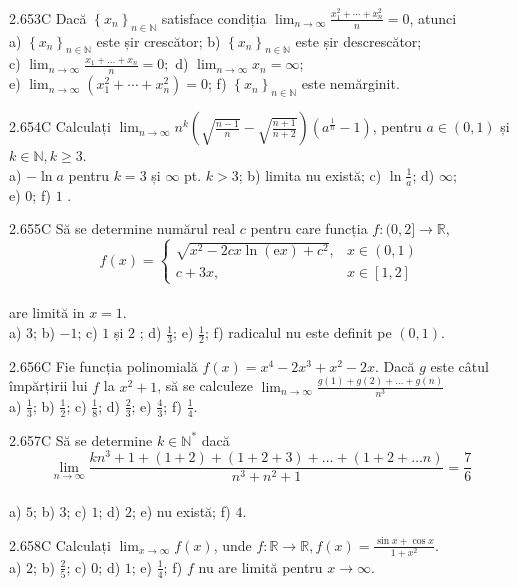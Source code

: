\documentclass[11pt]{article}
\begin{document}
2.653C Dacă $\left\{x_{n}\right\}_{n \in \mathbb{N}}$ satisface condiția $\lim _{n \rightarrow \infty} \frac{x_{1}^{2}+\cdots+x_{n}^{2}}{n}=0$, atunci\\ a) $\left\{x_{n}\right\}_{n \in \mathbb{N}}$ este șir crescător; b) $\left\{x_{n}\right\}_{n \in \mathbb{N}}$ este șir descrescător;\\ c) $\lim _{n \rightarrow \infty} \frac{x_{1}+\ldots+x_{n}}{n}=0 ;$ d) $\lim _{n \rightarrow \infty} x_{n}=\infty$;\\ e) $\lim _{n \rightarrow \infty}\left(x_{1}^{2}+\cdots+x_{n}^{2}\right)=0$; f) $\left\{x_{n}\right\}_{n \in \mathbb{N}}$ este nemărginit.

2.654C Calculați $\lim _{n \rightarrow \infty} n^{k}\left(\sqrt{\frac{n-1}{n}}-\sqrt{\frac{n+1}{n+2}}\right)\left(a^{\frac{1}{n}}-1\right)$, pentru $a \in(0,1)$ și $k \in \mathbb{N}, k \geq 3$.\\ a) $-\ln a$ pentru $k=3$ și $\infty$ pt. $k>3$; b) limita nu există; c) $\ln \frac{1}{a}$; d) $\infty$;\\ e) $0$; f) $1$ .

2.655C Să se determine numărul real $c$ pentru care funcția $f:(0,2] \rightarrow \mathbb{R}$, $$f(x)= \begin{cases}\sqrt{x^{2}-2 c x \ln (\mathrm{e} x)+c^{2}}, & x \in(0,1) \\ c+3 x, & x \in[1,2]\end{cases}$$\\are limită in $x=1$.\\ a) $3$; b) $-1$; c) $1$ și $2$ ; d) $\frac{1}{3}$; e) $\frac{1}{2}$; f) radicalul nu este definit pe $(0,1)$.

2.656C Fie funcția polinomială $f(x)=x^{4}-2 x^{3}+x^{2}-2 x$. Dacă $g$ este câtul împărțirii lui $f$ la $x^{2}+1$, să se calculeze $\lim _{n \rightarrow \infty} \frac{g(1)+g(2)+\ldots+g(n)}{n^{3}}$\\ a) $\frac{1}{3}$; b) $\frac{1}{2}$; c) $\frac{1}{8}$; d) $\frac{2}{3}$; e) $\frac{4}{3}$; f) $\frac{1}{4}$.

2.657C Să se determine $k \in \mathbb{N}^{*}$ dacă $$\lim _{n \rightarrow \infty} \frac{k n^{3}+1+(1+2)+(1+2+3)+\ldots+(1+2+\ldots n)}{n^{3}+n^{2}+1}=\frac{7}{6}$$\\ a) $5$; b) $3$; c) $1$; d) $2$; e) nu există; f) $4$.

2.658C Calculați $\lim _{x \rightarrow \infty} f(x)$, unde $f: \mathbb{R} \rightarrow \mathbb{R}, f(x)=\frac{\sin x+\cos x}{1+x^{2}}$.\\ a) $2$; b) $\frac{2}{5}$; c) $0$; d) $1$; e) $\frac{1}{4}$; f) $f$ nu are limită pentru $x \rightarrow \infty$.
\end{document}
